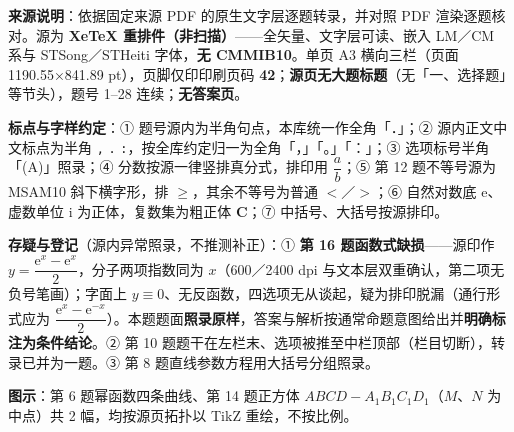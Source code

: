 


\begin{gktip}
\textbf{来源说明}：依据固定来源 PDF 的原生文字层逐题转录，并对照 PDF 渲染逐题核对。源为 \textbf{XeTeX 重排件（非扫描）}——全矢量、文字层可读、嵌入 LM／CM 系与 STSong／STHeiti 字体，\textbf{无 CMMIB10}。单页 A3 横向三栏（页面 1190.55×841.89 pt），页脚仅印印刷页码 \textbf{42}；\textbf{源页无大题标题}（无「一、选择题」等节头），题号 1–28 连续；\textbf{无答案页}。

\textbf{标点与字样约定}：① 题号源内为半角句点，本库统一作全角「．」；② 源内正文中文标点为半角 \texttt{,} \texttt{.} \texttt{:}，按全库约定归一为全角「，」「。」「：」；③ 选项标号半角「(A)」照录；④ 分数按源一律竖排真分式，排印用 \(\dfrac{a}{b}\)；⑤ 第 12 题不等号源为 MSAM10 斜下横字形，排 \(\geqslant\)，其余不等号为普通 \(<\)／\(>\)；⑥ 自然对数底 \(\mathrm{e}\)、虚数单位 \(\mathrm{i}\) 为正体，复数集为粗正体 \(\mathbf{C}\)；⑦ 中括号、大括号按源排印。

\textbf{存疑与登记}（源内异常照录，不推测补正）：① \textbf{第 16 题函数式缺损}——源印作 \(y=\dfrac{\mathrm{e}^{x}-\mathrm{e}^{x}}{2}\)，分子两项指数同为 \(x\)（600／2400 dpi 与文本层双重确认，第二项无负号笔画）；字面上 \(y\equiv0\)、无反函数，四选项无从谈起，疑为排印脱漏（通行形式应为 \(\dfrac{\mathrm{e}^{x}-\mathrm{e}^{-x}}{2}\)）。本题题面\textbf{照录原样}，答案与解析按通常命题意图给出并\textbf{明确标注为条件结论}。② 第 10 题题干在左栏末、选项被推至中栏顶部（栏目切断），转录已并为一题。③ 第 8 题直线参数方程用大括号分组照录。

\textbf{图示}：第 6 题幂函数四条曲线、第 14 题正方体 \(ABCD-A_1B_1C_1D_1\)（\(M\)、\(N\) 为中点）共 2 幅，均按源页拓扑以 TikZ 重绘，不按比例。
\end{gktip}

